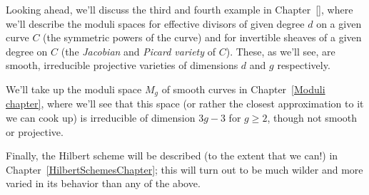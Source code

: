 Looking ahead, we'll discuss the third and fourth example in Chapter~\ref{}, where we'll describe the moduli spaces for effective divisors of given degree $d$ on a given curve $C$ (the symmetric powers of the curve) and for invertible sheaves of a given degree on $C$ (the \emph{Jacobian} and \emph{Picard variety} of $C$). These, as we'll see, are smooth, irreducible projective varieties of dimensions $d$ and $g$ respectively.

We'll take up the moduli space $M_g$ of smooth curves in Chapter~\ref{Moduli chapter}, where we'll see that this space (or rather the closest approximation to it we can cook up) is irreducible of dimension $3g-3$ for $g \geq 2$, though not smooth or projective.

Finally, the Hilbert scheme will be described (to the extent that we can!) in Chapter~\ref{HilbertSchemesChapter}; this will turn out to be much wilder and more varied in its behavior than any of the above.




